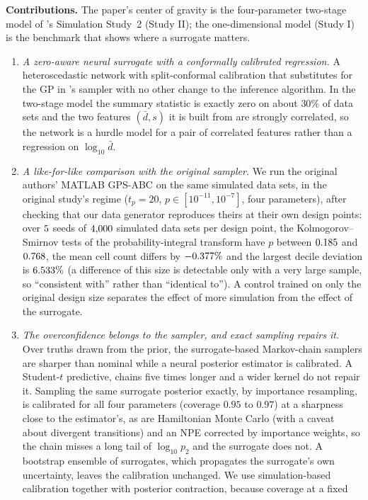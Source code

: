 \documentclass[sn-basic,iicol,pdflatex]{sn-jnl}
\begin{document}
\noindent\textbf{Contributions.} The paper's center of gravity is the four-parameter
two-stage model of \citeauthor{lu2023}'s Simulation Study~2 (Study II); the
one-dimensional model (Study I) is the benchmark that shows where a surrogate
matters.
\begin{enumerate}[label=(\roman*),leftmargin=*,itemsep=2pt,topsep=2pt]
\item \emph{A zero-aware neural surrogate with a conformally calibrated regression.} A heteroscedastic network
with split-conformal calibration \citep{lei2018} that substitutes for the GP in
\citeauthor{lu2023}'s sampler with no other change to the inference algorithm. In
the two-stage model the summary statistic is exactly zero on about $30\%$ of data
sets and the two features $(\bar d,s)$ it is built from are strongly correlated, so
the network is a hurdle model for a pair of correlated features rather than a
regression on $\log_{10}\bar d$.
\item \emph{A like-for-like comparison with the original sampler.} We run the
original authors' MATLAB GPS-ABC on the same simulated data sets, in the original
study's regime ($t_p=20$, $p\in[10^{-11},10^{-7}]$, four parameters), after checking
that our data generator reproduces theirs at their own design points: over $5$ seeds of $4{,}000$ simulated data sets per design point, the
Kolmogorov--Smirnov tests of the probability-integral transform have $p$ between $0.185$ and $0.768$, the mean cell count differs by $-0.377\%$ and the
largest decile deviation is $6.533\%$ (a difference of this size is detectable only with a very large sample, so ``consistent with'' rather than ``identical to''). A control trained on only the original design size separates the effect
of more simulation from the effect of the surrogate.
\item \emph{The overconfidence belongs to the sampler, and exact sampling repairs it.} Over truths drawn from the prior, the surrogate-based
Markov-chain samplers are sharper than nominal while a neural posterior estimator is calibrated. A Student-$t$ predictive, chains five times longer and a wider kernel do not repair it. Sampling the same
surrogate posterior exactly, by importance resampling, is calibrated for all four parameters (coverage $0.95$ to $0.97$) at a sharpness close to the estimator's, as are Hamiltonian Monte Carlo (with a caveat about divergent transitions) and an NPE corrected by importance weights, so the chain misses a long
tail of $\log_{10}p_2$ and the surrogate does not. A bootstrap ensemble of surrogates, which propagates the surrogate's own uncertainty, leaves the calibration unchanged. We use simulation-based calibration \citep{talts2018} together with posterior contraction, because coverage at a fixed

\end{enumerate}
\end{document}
